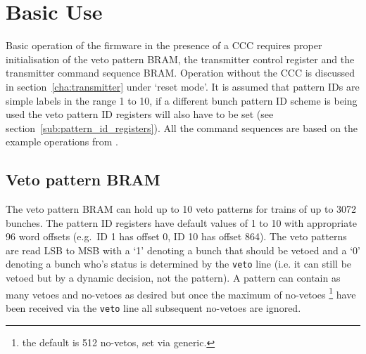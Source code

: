     \ifpdf
    \else
    \fi

    \chapter{Basic Use} %
    \label{cha:basic_use}
    Basic operation of the firmware in the presence of a CCC requires proper initialisation of the veto pattern BRAM, the transmitter control register and the transmitter command sequence BRAM. Operation without the CCC is discussed in section~\ref{cha:transmitter} under `reset mode'. It is assumed that pattern IDs are simple labels in the range 1 to 10, if a different bunch pattern ID scheme is being used the veto pattern ID registers will also have to be set (see section~\ref{sub:pattern_id_registers}). All the command sequences are based on the example operations from \cite{lpd_manual}.
    
    \section{Veto pattern BRAM} %
    \label{sub:basic_veto_pattern_bram}
    The veto pattern BRAM can hold up to 10 veto patterns for trains of up to 3072 bunches. The pattern ID registers have default values of 1 to 10 with appropriate 96 word offsets (e.g.\ ID 1 has offset 0, ID 10 has offset 864). The veto patterns are read LSB to MSB with a `1' denoting a bunch that should be vetoed and a `0' denoting a bunch who's status is determined by the \texttt{veto} line (i.e. it can still be vetoed but by a dynamic decision, not the pattern). A pattern can contain as many vetoes and no-vetoes as desired but once the maximum of no-vetoes \footnote{the default is 512 no-vetos, set via generic.} have been received via the \texttt{veto} line all subsequent no-vetoes are ignored.
    

